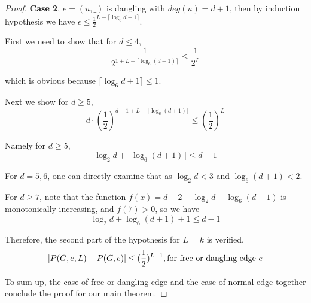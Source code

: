 \begin{proof}
		{\bf Case 2}, $e=(u,\_)$ is dangling with $deg(u)=d+1$, then by induction hypothesis we have 
		$\epsilon \leq \frac{1}{2}^{L-\lceil \log_6{d+1}\rceil}$.

		First we need to show that for $d \leq 4$,
		\[\frac{1}{2^{1+L-\lceil \log_6{(d+1)}\rceil}} \leq \frac{1}{2^L}\]

		which is obvious because $\lceil\log_6{d+1}\rceil \leq 1$.

		Next we show for $d \geq 5$,
		\[ d\cdot \left( \frac{1}{2} \right)^{d-1 + L - \lceil \log_6{(d+1)}\rceil}  \leq \left( \frac{1}{2} \right)^L \]

		Namely for $d \geq 5$,
		\[ \log_2 d + \lceil \log_6{(d+1)} \rceil \leq d-1\]

		For $d=5,6$, one can directly examine that as $\log_2 d < 3$ and $\log_6 (d+1) < 2$.


		For $d\geq 7$, note that the function $f(x) = d-2 -\log_2 d - \log_6{(d+1)}$ is monotonically increasing, and $f(7)>0$, so we have 
        \[ \log_2 d + \log_6{(d+1)} + 1 \leq d-1\]

%
%
%
%

		Therefore, the second part of the hypothesis for $L=k$ is verified.
		\[\left\vert P(G,e,L) - P(G,e)\right\vert \leq (\frac{1}{2})^{L+1}, \textrm{for free or dangling edge $e$}\]

		
		To sum up, the case of free or dangling edge and the case of normal edge together conclude the proof for our main theorem.
	\end{proof}
